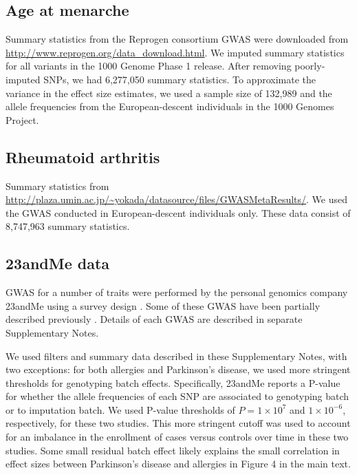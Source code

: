 \documentclass[11pt,titlepage]{article}
\begin{document}
\subsection{Age at menarche}
Summary statistics from the Reprogen consortium GWAS \citep{Perry:2014aa} were downloaded from \url{http://www.reprogen.org/data_download.html}. We imputed summary statistics for all variants in the 1000 Genome Phase 1 release. After removing poorly-imputed SNPs, we had 6,277,050 summary statistics. To approximate the variance in the effect size estimates, we used a sample size of 132,989 and the allele frequencies from the European-descent individuals in the 1000 Genomes Project. 


\subsection{Rheumatoid arthritis}
Summary statistics from \url{http://plaza.umin.ac.jp/~yokada/datasource/files/GWASMetaResults/}. We used the GWAS conducted in European-descent individuals only. These data consist of 8,747,963 summary statistics.

\subsection{23andMe data} 
GWAS for a number of traits were performed by the personal genomics company 23andMe using a survey design \citep{Eriksson:2010aa}. Some of these GWAS have been partially described previously \citep{Eriksson:2012ab, Eriksson:2012aa, Eriksson:2010aa, Do:2011aa, Kiefer:2013aa}. Details of each GWAS are described in separate Supplementary Notes.

We used filters and summary data described in these Supplementary Notes, with two exceptions: for both allergies and Parkinson's disease, we used more stringent thresholds for genotyping batch effects. Specifically, 23andMe reports a P-value for whether the allele frequencies of each SNP are associated to genotyping batch or to imputation batch. We used P-value thresholds of $P = 1\times 10^{7}$ and $1\times10^{-6}$, respectively, for these two studies. This more stringent cutoff was used to account for an imbalance in the enrollment of cases versus controls over time in these two studies. Some small residual batch effect likely explains the small correlation in effect sizes between Parkinson's disease and allergies in Figure 4 in the main text.

%
\end{document}
